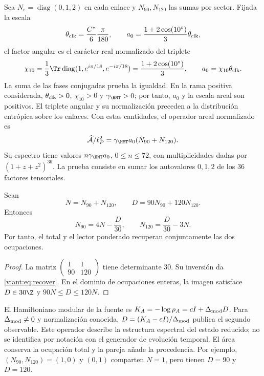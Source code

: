 Sea $N_e=\operatorname{diag}(0,1,2)$ en cada enlace y
$N_{90},N_{120}$ las sumas por sector. Fijada la escala
\[
\theta_{\rm clk}=\frac{C^*}{6}\frac{\pi}{180},\qquad
a_0=\frac{1+2\cos(10^\circ)}3\theta_{\rm clk},
\]
el factor angular es el carácter real normalizado del triplete
\begin{equation}
 \chi_{10}=\frac13\Tr\operatorname{diag}
       (1,e^{i\pi/18},e^{-i\pi/18})
 =\frac{1+2\cos(10^\circ)}3,
 \qquad a_0=\chi_{10}\theta_{\rm clk}.
 \label{v:ant:eq:ii-area-caracter-triplete}
\end{equation}
La suma de las fases conjugadas prueba la igualdad. En la rama positiva
considerada, \(\theta_{\rm clk}>0\), \(\chi_{10}>0\) y
\(\gamma_{\HMT}>0\); por tanto, \(a_0\) y la escala areal son
positivos. El triplete angular y su normalización preceden a la
distribución entrópica sobre los enlaces. Con estas cantidades,
el operador areal normalizado es
\[
\widehat{\mathcal A}/\ell_P^2
=\gamma_{\HMT}a_0(N_{90}+N_{120}).
\]
Su espectro tiene valores $n\gamma_{\HMT}a_0$, $0\le n\le72$,
con multiplicidades dadas por $(1+z+z^2)^{36}$.
La prueba consiste en sumar los autovalores $0,1,2$ de los
36 factores tensoriales.

\begin{theorem}
Sean
\[
N=N_{90}+N_{120},\qquad D=90N_{90}+120N_{120}.
\]
Entonces
\begin{equation}
N_{90}=4N-\frac D{30},\qquad
N_{120}=\frac D{30}-3N.
\label{v:ant:eq:recover}
\end{equation}
Por tanto, el total y el lector ponderado recuperan conjuntamente
las dos ocupaciones.
\end{theorem}
\begin{proof}
La matriz $\left(\begin{smallmatrix}1&1\\90&120\end{smallmatrix}\right)$
tiene determinante $30$. Su inversión da \eqref{v:ant:eq:recover}.
En el dominio de ocupaciones enteras, la imagen satisface
$D\in30\Z$ y $90N\le D\le120N$.
\end{proof}

El Hamiltoniano modular de la fuente es
$K_A=-\log\rho_A=cI+\Delta_{\rm mod}D$.
Para $\Delta_{\rm mod}\ne0$ y normalización conocida,
$D=(K_A-cI)/\Delta_{\rm mod}$ publica el segundo observable.
Este operador describe la estructura espectral del estado reducido;
no se identifica por notación con el generador de evolución temporal.
El área conserva la ocupación total y la pareja añade la procedencia.
Por ejemplo, $(N_{90},N_{120})=(1,0)$ y $(0,1)$ comparten $N=1$,
pero tienen $D=90$ y $D=120$.

